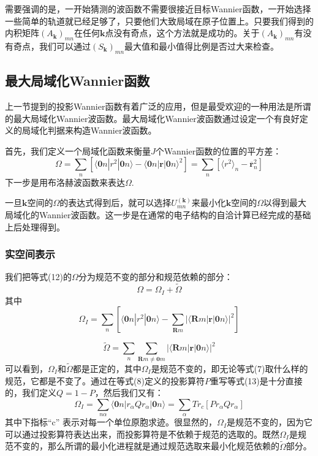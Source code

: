 需要强调的是，一开始猜测的波函数不需要很接近目标Wannier函数，一开始选择一些简单的轨道就已经足够了，只要他们大致局域在原子位置上。只要我们得到的内积矩阵$(A_{\bm{k}})_{mn}$在任何$\bm{k}$点没有奇点，这个方法就是成功的。关于$(A_{\bm{k}})_{mn}$有没有奇点，我们可以通过$(S_{\bm{k}})_{mn}$最大值和最小值得比例是否过大来检查。

\subsection{最大局域化Wannier函数}
上一节提到的投影Wannier函数有着广泛的应用，但是最受欢迎的一种用法是所谓的最大局域化Wannier波函数。最大局域化Wannier波函数通过设定一个有良好定义的局域化判据来构造Wannier波函数。

首先，我们定义一个局域化函数来衡量$J$个Wannier函数的位置的平方差：
\begin{equation}
\Omega=\sum_n [\langle\bm{0} n | r^2 | \bm{0}n \rangle -\langle \bm{0}n|\bm{r}|\bm{0}n\rangle^2]=\sum_n[\langle r^2\rangle_n-\bm{\overline r}^2_n]
\end{equation}
下一步是用布洛赫波函数来表达$\Omega$.

一旦$\bm{k}$空间的$\Omega$的表达式得到后，就可以选择$U^{(\bm{k})}_{mn}$来最小化$\bm{k}$空间的$\Omega$以得到最大局域化的Wannier波函数。这一步是在通常的电子结构的自洽计算已经完成的基础上后处理得到。


\subsubsection{实空间表示}
我们把等式(12)的$\Omega$分为规范不变的部分和规范依赖的部分：
\begin{equation}
\Omega=\Omega_I+\widetilde\Omega
\end{equation}
其中
\begin{equation}
\Omega_I=\sum_n [\langle\bm{0} n | r^2 | \bm{0}n \rangle -\sum_{\bm{R}m}|\langle \bm{R}m|\bm{r}|\bm{0}n\rangle|^2] 
\end{equation}

\begin{equation}
\widetilde \Omega=\sum_n \sum_{\bm{R}m\neq \bm{0}m}|\langle \bm{R}m|\bm{r}|\bm{0}n\rangle|^2
\end{equation}
可以看到，$\Omega_I$和$ \widetilde \Omega$都是正定的，其中$\Omega_I$是规范不变的，即无论等式(7)取什么样的规范，它都是不变了。通过在等式(8)定义的投影算符$P$重写等式(13)是十分直接的，我们定义$Q=1-P$，然后我们又有：
\begin{equation}
\Omega_I=\sum_{n\alpha} \langle\bm{0} n | r_\alpha Q  r_\alpha  | \bm{0}n \rangle=\sum_\alpha Tr_c[P r_\alpha Q r_\alpha]
\end{equation}
其中下指标“c” 表示对每一个单位原胞求迹。很显然的，$\Omega_I$是规范不变的，因为它可以通过投影算符表达出来，而投影算符是不依赖于规范的选取的。既然$\Omega_I$是规范不变的，那么所谓的最小化进程就是通过规范选取来最小化规范依赖的$ \widetilde \Omega$部分。

